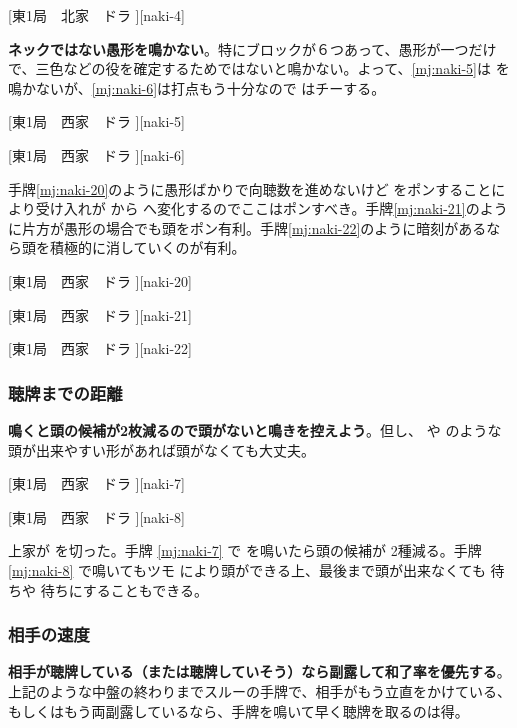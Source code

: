\documentclass[10pt, twocolumn]{article}
\begin{document}
[東1局　北家　ドラ ][naki-4]

\textbf{ネックではない愚形を鳴かない}\citep[][p.~40]{hirasawa-naki}。特にブロックが６つあって、愚形が一つだけで、三色などの役を確定するためではないと鳴かない。よって、\ref{mj:naki-5}は  を鳴かないが、\ref{mj:naki-6}は打点もう十分なので  はチーする。

[東1局　西家　ドラ ][naki-5]

[東1局　西家　ドラ ][naki-6]

手牌\ref{mj:naki-20}のように愚形ばかりで向聴数を進めないけど  をポンすることにより受け入れが  から  へ変化するのでここはポンすべき\citep[][p.~199]{hirasawa-naki}。手牌\ref{mj:naki-21}のように片方が愚形の場合でも頭をポン有利。手牌\ref{mj:naki-22}のように暗刻があるなら頭を積極的に消していくのが有利。

[東1局　西家　ドラ ][naki-20]

[東1局　西家　ドラ ][naki-21]

[東1局　西家　ドラ ][naki-22]

\subsubsection*{聴牌までの距離} 

\textbf{鳴くと頭の候補が2枚減るので頭がないと鳴きを控えよう}\citep[][p.~55]{hirasawa-naki}。但し、 や  のような頭が出来やすい形があれば頭がなくても大丈夫。

[東1局　西家　ドラ ][naki-7]

[東1局　西家　ドラ ][naki-8]

上家が  を切った。手牌 \ref{mj:naki-7} で  を鳴いたら頭の候補が  2種減る。手牌 \ref{mj:naki-8} で鳴いてもツモ  により頭ができる上、最後まで頭が出来なくても  待ちや  待ちにすることもできる。

\subsubsection*{相手の速度} 

\textbf{相手が聴牌している（または聴牌していそう）なら副露して和了率を優先する}\citep[][p.~153]{hirasawa-naki}。上記のような中盤の終わりまでスルーの手牌で、相手がもう立直をかけている、もしくはもう両副露しているなら、手牌を鳴いて早く聴牌を取るのは得。
\end{document}
